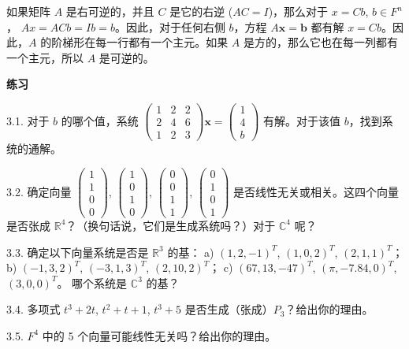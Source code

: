 如果矩阵 $A$ 是右可逆的，并且 $C$ 是它的右逆 ($AC = I$)，那么对于 $x = C b$, $b \in F^n$， $A x = AC b = I b = b$。因此，对于任何右侧 $b$，方程 $A \mathbf{x} = \mathbf{b}$ 都有解 $x = C b$。因此，$A$ 的阶梯形在每一行都有一个主元。如果 $A$ 是方的，那么它也在每一列都有一个主元，所以 $A$ 是可逆的。

\textbf{练习}~

3.1. 对于 $b$ 的哪个值，系统 $\begin{pmatrix} 1 & 2 & 2 \\ 2 & 4 & 6 \\ 1 & 2 & 3 \end{pmatrix} \mathbf{x} = \begin{pmatrix} 1 \\ 4 \\ b \end{pmatrix}$ 有解。对于该值 $b$，找到系统的通解。

3.2. 确定向量 $\begin{pmatrix} 1 \\ 1 \\ 0 \\ 0 \end{pmatrix}$, $\begin{pmatrix} 1 \\ 0 \\ 1 \\ 0 \end{pmatrix}$, $\begin{pmatrix} 0 \\ 0 \\ 1 \\ 1 \end{pmatrix}$, $\begin{pmatrix} 0 \\ 1 \\ 0 \\ 1 \end{pmatrix}$ 是否线性无关或相关。这四个向量是否张成 $\mathbb{R}^4$？（换句话说，它们是生成系统吗？）对于 $\mathbb{C}^4$ 呢？

3.3. 确定以下向量系统是否是 $\mathbb{R}^3$ 的基：
a) $(1, 2, -1)^T$, $(1, 0, 2)^T$, $(2, 1, 1)^T$；
b) $(-1, 3, 2)^T$, $(-3, 1, 3)^T$, $(2, 10, 2)^T$；
c) $(67, 13, -47)^T$, $(\pi, -7.84, 0)^T$, $(3, 0, 0)^T$。
哪个系统是 $\mathbb{C}^3$ 的基？

3.4. 多项式 $t^3 + 2t$, $t^2 + t + 1$, $t^3 + 5$ 是否生成（张成）$P_3$？给出你的理由。

3.5. $F^4$ 中的 5 个向量可能线性无关吗？给出你的理由。

